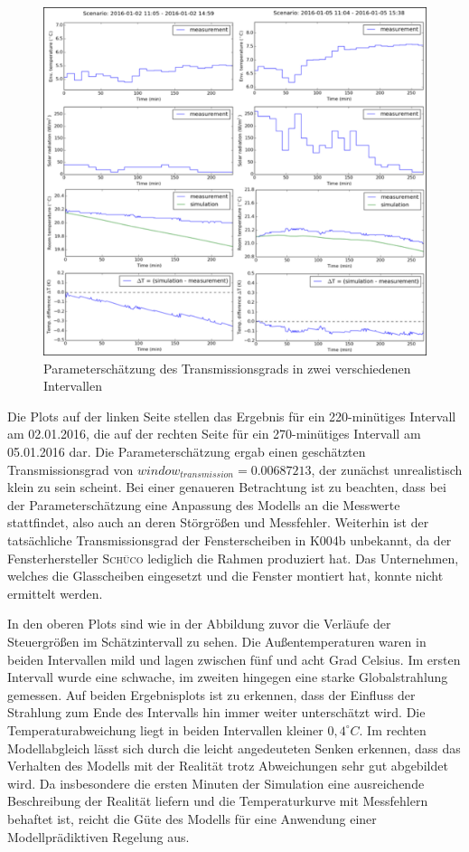 \begin{figure}
\centering
\includegraphics[width=\textwidth]{abbildungen/20160329_pestep2}
\caption{Parameterschätzung des Transmissionsgrads in zwei verschiedenen Intervallen}
\label{fig:step2}
\end{figure}

Die Plots auf der linken Seite stellen das Ergebnis für ein 220-minütiges Intervall am 02.01.2016, die auf der rechten Seite für ein 270-minütiges Intervall am 05.01.2016 dar. Die Parameterschätzung ergab einen geschätzten Transmissionsgrad von $window_{transmission}=0.00687213$, der zunächst unrealistisch klein zu sein scheint. Bei einer genaueren Betrachtung ist zu beachten, dass bei der Parameterschätzung eine Anpassung des Modells an die Messwerte stattfindet, also auch an deren Störgrößen und Messfehler. Weiterhin ist der tatsächliche Transmissionsgrad der Fensterscheiben in K004b unbekannt, da der Fensterhersteller \textsc{Schüco} lediglich die Rahmen produziert hat. Das Unternehmen, welches die Glasscheiben eingesetzt und die Fenster montiert hat, konnte nicht ermittelt werden. 

In den oberen Plots sind wie in der Abbildung zuvor die Verläufe der Steuergrößen im Schätzintervall zu sehen. Die Außentemperaturen waren in beiden Intervallen mild und lagen zwischen fünf und acht Grad Celsius. Im ersten Intervall wurde eine schwache, im zweiten hingegen eine starke Globalstrahlung gemessen. Auf beiden Ergebnisplots ist zu erkennen, dass der Einfluss der Strahlung zum Ende des Intervalls hin immer weiter unterschätzt wird. Die Temperaturabweichung liegt in beiden Intervallen kleiner $0,4^{\circ}C$. Im rechten Modellabgleich lässt sich durch die leicht angedeuteten Senken erkennen, dass das Verhalten des Modells mit der Realität trotz Abweichungen sehr gut abgebildet wird.
Da insbesondere die ersten Minuten der Simulation eine ausreichende Beschreibung der Realität liefern und die Temperaturkurve mit Messfehlern behaftet ist, reicht die Güte des Modells für eine Anwendung einer Modellprädiktiven Regelung aus. 


